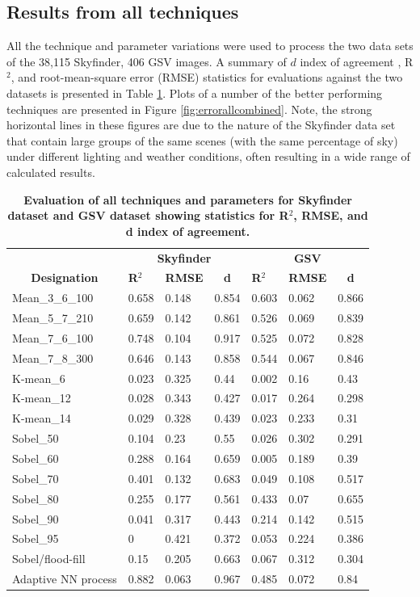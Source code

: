 \documentclass[final,3p,times,authoryear]{elsarticle}
\begin{document}
\subsection{Results from all techniques}\label{sec:resultsall}
All the technique and parameter variations were used to process the two data sets of the 38,115 Skyfinder, 406 GSV images. A summary of $d$ index of agreement \citep{Willmott1981}, R$^{2}$, and root-mean-square error (RMSE) statistics for evaluations against the two datasets is presented in Table \ref{tab:evalall}. Plots of a number of the better performing techniques are presented in Figure \ref{fig:errorallcombined}. Note, the strong horizontal lines in these figures are due to the nature of the Skyfinder data set that contain large groups of the same scenes (with the same percentage of sky) under different lighting and weather conditions, often resulting in a wide range of calculated results.

\begin{table}[!htbp]
\caption{\bf Evaluation of all techniques and parameters for Skyfinder dataset and GSV dataset showing statistics for R$^{2}$, RMSE, and d index of agreement. \label{tab:evalall}}     
\begin{tabular}{ l l l l l l l }
\multicolumn{1}{c}{\textbf{~}}
& \multicolumn{3}{c}{\textbf{Skyfinder}}
& \multicolumn{3}{c}{\textbf{GSV}}
\\ 
 \multicolumn{1}{c|}{\textbf{Designation}}
& \textbf{R$^{2}$} 
& \textbf{RMSE} 
& \multicolumn{1}{c|}{\textbf{d}}
& \textbf{R$^{2}$} 
& \textbf{RMSE}  
& \multicolumn{1}{c|}{\textbf{d}}
\\ \hline
Mean\_3\_6\_100	&0.658&0.148&0.854&0.603&0.062&0.866 \\
Mean\_5\_7\_210	&0.659&0.142&0.861&0.526&0.069&0.839 \\
Mean\_7\_6\_100	&0.748&0.104&0.917&0.525&0.072&0.828 \\
Mean\_7\_8\_300 &0.646&0.143&0.858&0.544&0.067&0.846  \\
K-mean\_6       &0.023&0.325&0.44&0.002&0.16  &0.43 \\
K-mean\_12      &0.028&0.343&0.427&0.017&0.264&0.298 \\
K-mean\_14      &0.029&0.328&0.439&0.023&0.233&0.31 \\
Sobel\_50       &0.104&0.23 &0.55&0.026&0.302&0.291 \\
Sobel\_60       &0.288&0.164&0.659&0.005&0.189&0.39 \\
Sobel\_70       &0.401&0.132&0.683&0.049&0.108&0.517 \\
Sobel\_80       &0.255&0.177&0.561&0.433&0.07 &0.655 \\
Sobel\_90       &0.041&0.317&0.443&0.214&0.142&0.515 \\
Sobel\_95       &0    &0.421&0.372&0.053&0.224&0.386 \\
\hline
Sobel/flood-fill&0.15&0.205&0.663&0.067&0.312&0.304 \\
\hline
Adaptive NN process&0.882&0.063&0.967&0.485&0.072&0.84 \\
\hline
\end{tabular}
\end{table}
\end{document}
